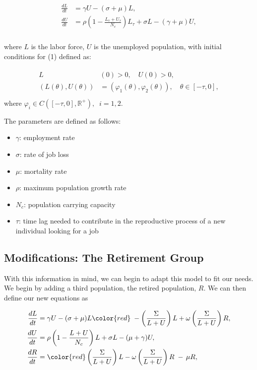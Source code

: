 \documentclass[11pt]{amsart}
\begin{document}
\begin{align}
    \begin{split}
        \frac{dL}{dt} &= \gamma U - (\sigma + \mu)L, \\
        \frac{dU}{dt} &= \rho \left(1 - \frac{L_{\tau} + U_{\tau}}{N_c} \right)L_{\tau} + \sigma L - (\gamma + \mu)U, \\
    \end{split}
\end{align}

where $L$ is the labor force, $U$ is the unemployed population, with initial conditions for (1) defined as:

\begin{align}
    \begin{split}
        L&(0) > 0, \quad U(0) > 0, \\
        (L(\theta),U(\theta)) &= (\varphi_1(\theta), \varphi_2(\theta)), \quad \theta \in [-\tau,0], \\
    \end{split}
\end{align}
where $\varphi_i\in C([-\tau, 0], \mathbb{R}^+),\;\; i=1,2$.

The parameters are defined as follows:

\begin{itemize}
    \item $\gamma$: employment rate
    \item $\sigma$: rate of job loss 
    \item $\mu$: mortality rate
    \item $\rho$: maximum population growth rate 
    \item $N_c$: population carrying capacity 
    \item $\tau$: time lag needed to contribute in the reproductive process of a new individual looking for a job
\end{itemize}

\subsection{Modifications: The Retirement Group}
 

With this information in mind, we can begin to adapt this model to fit our needs. We begin by adding a third population, the retired population, $R$.
We can then define our new equations as

\begin{align}
    \begin{split}
        \frac{dL}{dt} &= \gamma U - (\sigma + \mu)L {\color{red}\;- \left(\frac{\Sigma}{L + U}\right) L + \omega\left(\frac{\Sigma}{L + U}\right) R},\\
        \frac{dU}{dt} &= \rho\left(1 - \frac{L + U}{N_c} \right)L + \sigma L -(\mu + \gamma)U,  \\
        \frac{dR}{dt} &= {\color{red}\left(\frac{\Sigma}{L + U}\right) L - \omega\left(\frac{\Sigma}{L + U}\right) R \; - \, \mu R},
    \end{split}
\end{align}
\end{document}
